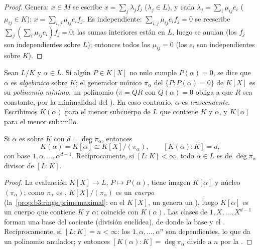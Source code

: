 \begin{proof}
Genera: $x \in M$ se escribe $x = \sum_j \lambda_jf_j$
($\lambda_j \in L$), y cada $\lambda_j = \sum_i \mu_{ij}e_i$
($\mu_{ij} \in K$): $x = \sum_{i,j}\mu_{ij}e_if_j$. Es independiente:
$\sum_{i,j}\mu_{ij}e_if_j = 0$ se reescribe $\sum_j (\sum_i
\mu_{ij}e_i)f_j = 0$; las sumas interiores están en $L$, luego se anulan
(los $f_j$ son independientes sobre $L$); entonces todos los
$\mu_{ij} = 0$ (los $e_i$ son independientes sobre $K$).
\end{proof}

\begin{definition}\label{def:b3:galois:algebraic}
Sean $L/K$ y $\alpha \in L$. Si algún $P \in K[X]$ no nulo cumple
$P(\alpha) = 0$, se dice que $\alpha$ es
\emph{algebraico} sobre $K$; el generador
mónico $\pi_\alpha$ del 
$\{P : P(\alpha) = 0\}$ de $K[X]$ es su \emph{polinomio
mínimo}, un polinomio
 ($\pi = QR$ con
$Q(\alpha) = 0$ obliga a que $R$ sea constante, por la minimalidad del
). En caso contrario, $\alpha$ es
\emph{trascendente}. Escribimos $K(\alpha)$ para el menor subcuerpo de
$L$ que contiene $K$ y $\alpha$, y $K[\alpha]$ para el menor subanillo.
\end{definition}

\begin{theorem}\label{thm:b3:galois:simple}
Si $\alpha$ es  sobre $K$
con $d = \deg\pi_\alpha$, entonces
\[
K(\alpha) = K[\alpha] \cong K[X]/(\pi_\alpha),
\qquad [K(\alpha) : K] = d,
\]
con base $1, \alpha, \dots, \alpha^{d-1}$. Recíprocamente, si
$[L:K] < \infty$, todo $\alpha \in L$ es
 de
 $\deg \pi_\alpha$ divisor de
$[L:K]$.
\end{theorem}

\begin{proof}
La evaluación $K[X] \to L$, $P \mapsto P(\alpha)$, tiene imagen
$K[\alpha]$ y núcleo $(\pi_\alpha)$; como $\pi_\alpha$ es
, $K[X]/(\pi_\alpha)$ es
un \emph{cuerpo} (la~\cref{prop:b3:rings:primemaximal}: en el
 $K[X]$, un
 genera un
), luego $K[\alpha]$ es
un cuerpo que contiene $K$ y $\alpha$: coincide con $K(\alpha)$. Las
clases de $1, X, \dots, X^{d-1}$ forman una base del cociente (división
euclídea), de donde la base y el
. Recíprocamente, si $[L:K]
= n < \infty$: los $1, \alpha, \dots, \alpha^n$ son dependientes, lo que
da un polinomio anulador; y entonces $[K(\alpha):K] =
\deg\pi_\alpha$ divide a $n$ por la .
\end{proof}

